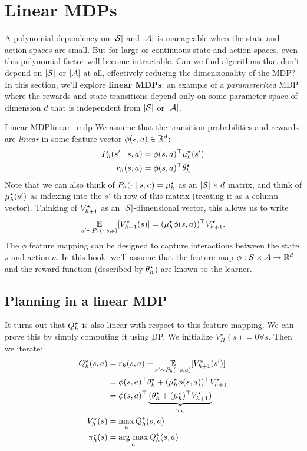 \documentclass[\main/main]{subfiles}
\begin{document}
\section{Linear MDPs}

A polynomial dependency on $|\S|$ and $|\A|$ is manageable when the state and action spaces are small.
But for large or continuous state and action spaces, even this polynomial factor will become intractable.
Can we find algorithms that don't depend on $|\S|$ or $|\A|$ at all,
effectively reducing the dimensionality of the MDP?
In this section, we'll explore \textbf{linear MDPs}: an example of a \emph{parameterized} MDP where the rewards and state transitions depend only on some parameter space of dimension $d$ that is independent from $|\S|$ or $|\A|$.

\begin{definition}{Linear MDP}{linear_mdp}
    We assume that the transition probabilities and rewards are \emph{linear} in some feature vector $\phi(s, a) \in \R^d$:
    \begin{align*}
        P_\hi(s' \mid s, a) & = \phi(s, a)^\top \mu^\star_\hi(s') \\
        r_\hi(s, a)         & = \phi(s, a)^\top \theta_\hi^\star
    \end{align*}
    Note that we can also think of $P_\hi(\cdot \mid s, a) = \mu_\hi^\star$ as an $|\S| \times d$ matrix, and think of $\mu^\star_\hi(s')$ as indexing into the $s'$-th row of this matrix (treating it as a column vector). Thinking of $\Vopt_{\hi+1}$ as an $|\S|$-dimensional vector, this allows us to write \[ \E_{s' \sim P_\hi(\cdot \mid s, a)}[\Vopt_{\hi+1}(s)] = (\mu^\star_\hi \phi(s, a))^\top \Vopt_{\hi+1}. \]
    The $\phi$ feature mapping can be designed to capture interactions between the state $s$ and action $a$.
    In this book, we'll assume that the feature map $\phi : \S \times \A \to \R^d$ and the reward function (described by $\theta_\hi^\star$) are known to the learner.
\end{definition}


\subsection{Planning in a linear MDP}

It turns out that $\Qopt_\hi$ is also linear with respect to this feature mapping.
We can prove this by simply computing it using DP.
We initialize $V_{H}^\star(s) = 0 \forall s$. Then we iterate:
\begin{align*}
    \Qopt_\hi(s, a)  & = r_\hi(s, a) + \E_{s' \sim P_\hi(\cdot \mid s, a)} [\Vopt_{h+1}(s')]                          \\
                     & = \phi(s, a)^\top \theta_\hi^\star + (\mu_\hi^\star \phi(s, a))^\top \Vopt_{h+1}               \\
                     & = \phi(s, a)^\top \underbrace{( \theta_\hi^\star + (\mu_\hi^\star)^\top  \Vopt_{h+1})}_{w_\hi} \\
    \Vopt_\hi(s)     & = \max_a \Qopt_\hi(s, a)                                                                       \\
    \pi^\star_\hi(s) & = \argmax_a \Qopt_\hi(s, a)
\end{align*}
\end{document}

